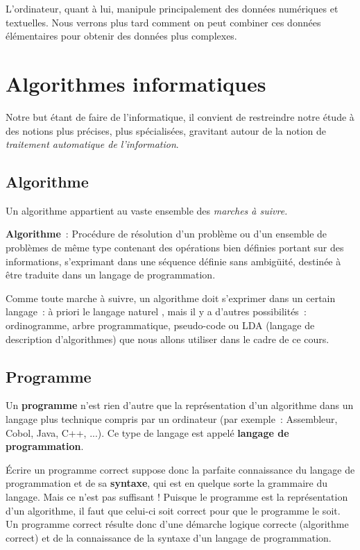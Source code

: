 		L'ordinateur, quant à lui, manipule principalement
		des données numériques et textuelles. 
		Nous verrons plus tard comment on
		peut combiner ces données élémentaires pour obtenir 
		des données plus complexes.

\section{Algorithmes informatiques}

	Notre but étant de faire de l’informatique, il convient de restreindre
	notre étude à des notions plus précises, plus spécialisées, gravitant
	autour de la notion de \textit{traitement automatique de
	l’information}.

	\subsection{Algorithme}

		Un algorithme appartient au vaste ensemble des \textit{marches à
		suivre.}

		\textbf{Algorithme}~: Procédure de résolution d'un problème 
		ou d'un ensemble de problèmes de même type contenant des opérations
		bien définies portant sur des informations, s’exprimant dans une
		séquence définie sans ambigüité, destinée à être traduite dans 
		un langage de programmation.
	
		Comme toute marche à suivre, un algorithme doit s’exprimer dans un
		certain langage~: à priori le langage naturel , mais il y a d’autres
		possibilités~: ordinogramme, arbre programmatique, pseudo-code ou LDA
		(langage de description d’algorithmes) que nous allons utiliser dans le
		cadre de ce cours.

	\subsection{Programme}

		Un \textbf{programme} n’est rien d’autre que la représentation d’un
		algorithme dans un langage plus technique compris par 
		un ordinateur (par exemple~:
		Assembleur, Cobol, Java, 
		C++, ...). Ce type de langage est appelé \textbf{langage de
		programmation}.
		
		Écrire un programme correct suppose donc la parfaite connaissance du
		langage de programmation et de sa \textbf{syntaxe}, qui est en quelque
		sorte la grammaire du langage. Mais ce n’est pas suffisant ! Puisque le
		programme est la représentation d’un algorithme, il faut que celui-ci
		soit correct pour que le programme le soit. Un programme correct
		résulte donc d’une démarche logique correcte (algorithme correct) et de
		la connaissance de la syntaxe d’un langage de programmation.
		
